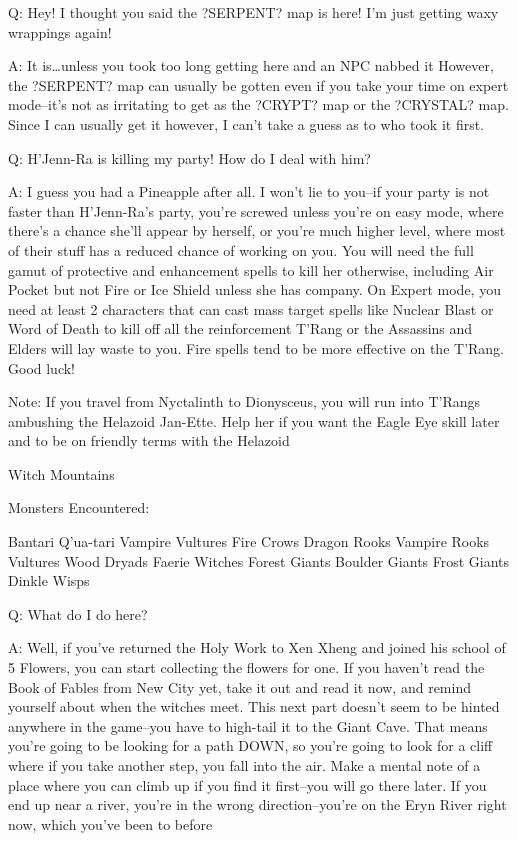 \documentclass[12pt]{article}
\begin{document}
Q: Hey! I thought you said the ?SERPENT? map is here! I'm just getting
waxy wrappings again!

A: It is\ldots{}unless you took too long getting here and an NPC nabbed
it However, the ?SERPENT? map can usually be gotten even if you take
your time on expert mode--it's not as irritating to get as the ?CRYPT?
map or the ?CRYSTAL? map. Since I can usually get it however, I can't
take a guess as to who took it first.

Q: H'Jenn-Ra is killing my party! How do I deal with him?

A: I guess you had a Pineapple after all. I won't lie to you--if your
party is not faster than H'Jenn-Ra's party, you're screwed unless you're
on easy mode, where there's a chance she'll appear by herself, or you're
much higher level, where most of their stuff has a reduced chance of
working on you. You will need the full gamut of protective and
enhancement spells to kill her otherwise, including Air Pocket but not
Fire or Ice Shield unless she has company. On Expert mode, you need at
least 2 characters that can cast mass target spells like Nuclear Blast
or Word of Death to kill off all the reinforcement T'Rang or the
Assassins and Elders will lay waste to you. Fire spells tend to be more
effective on the T'Rang. Good luck!

Note: If you travel from Nyctalinth to Dionysceus, you will run into
T'Rangs ambushing the Helazoid Jan-Ette. Help her if you want the Eagle
Eye skill later and to be on friendly terms with the Helazoid

Witch Mountains

Monsters Encountered:

Bantari Q'ua-tari Vampire Vultures Fire Crows Dragon Rooks Vampire Rooks
Vultures Wood Dryads Faerie Witches Forest Giants Boulder Giants Frost
Giants Dinkle Wisps

Q: What do I do here?

A: Well, if you've returned the Holy Work to Xen Xheng and joined his
school of 5 Flowers, you can start collecting the flowers for one. If
you haven't read the Book of Fables from New City yet, take it out and
read it now, and remind yourself about when the witches meet. This next
part doesn't seem to be hinted anywhere in the game--you have to
high-tail it to the Giant Cave. That means you're going to be looking
for a path DOWN, so you're going to look for a cliff where if you take
another step, you fall into the air. Make a mental note of a place where
you can climb up if you find it first--you will go there later. If you
end up near a river, you're in the wrong direction--you're on the Eryn
River right now, which you've been to before
\end{document}
